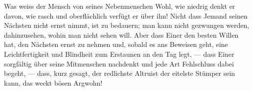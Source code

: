 Was weiss der Mensch von seines Nebenmenschen Wohl, wie niedrig denkt er davon, wie rasch und oberflächlich verfügt er über ihn! Nicht dass Jemand seinen Nächsten nicht ernst nimmt, ist zu bedauern; man kann nicht gezwungen werden, dahinzusehen, wohin man nicht sehen will. Aber dass Einer den besten Willen hat, den Nächsten ernst zu nehmen und, sobald es ans Beweisen geht, eine Leichtfertigkeit und Blindheit zum Erstaunen an den Tag legt, — dass Einer sorgfältig über seine Mitmenschen nachdenkt und jede Art Fehlschluss dabei begeht, — dass, kurz gesagt, der redlichste Altruist der eitelste Stümper sein kann, das weckt bösen Argwohn!
\par

